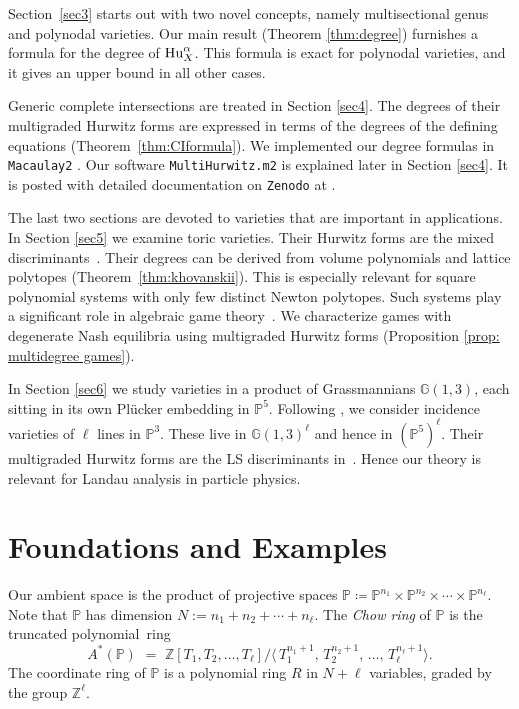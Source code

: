 \documentclass[12pt]{article}
\theoremstyle{definition}
\newcommand{\bZ}{\mathbb Z}
\newcommand{\bG}{\mathbb G}
\newcommand{\bP}{\mathbb P}
\begin{document}
Section~\ref{sec3} starts out with two novel concepts, namely
multisectional genus and polynodal varieties.
Our main result (Theorem \ref{thm:degree})
 furnishes a formula for the degree of ${\rm Hu}^\alpha_X$.
This formula is exact for polynodal varieties, and it 
gives an upper bound 
in all other cases.

Generic complete intersections are treated in Section \ref{sec4}.
The degrees of their multigraded Hurwitz forms are expressed
in terms of the degrees of the defining equations (Theorem~\ref{thm:CIformula}).
We implemented our degree formulas in {\tt Macaulay2} \cite{M2}.
Our software {\tt MultiHurwitz.m2} is explained later in Section \ref{sec4}.
It is posted with detailed documentation 
on {\tt Zenodo} at \cite{zenodo}.
 
 The last two sections are devoted to varieties that are important in applications. In Section \ref{sec5}
  we examine toric varieties. Their Hurwitz forms
  are the mixed discriminants~\cite{CCDDS}. 
  Their degrees can be derived from volume polynomials \cite{Huh}
  and lattice polytopes   (Theorem~\ref{thm:khovanskii}).
  This is especially relevant for square
polynomial  systems with  only few distinct Newton polytopes.
  Such systems play a significant role in algebraic game theory~\cite{vectorBundleNash}.
We characterize games with degenerate Nash equilibria using 
multigraded Hurwitz forms (Proposition \ref{prop: multidegree games}).

  In Section \ref{sec6} we study varieties in a product of Grassmannians
  $\bG(1,3)$,   each sitting in its own Pl\"ucker embedding in $\bP^5$.
   Following \cite{HMPS1}, we consider
  incidence varieties of $\ell$ lines in $\bP^3$. These live
 in $\bG(1,3)^\ell$ and hence in $(\bP^5)^\ell$.
 Their multigraded Hurwitz forms are  the
LS discriminants in~\cite{HMPS2}.
Hence our theory is relevant for
  Landau analysis in particle physics. 

\section{Foundations and Examples}
\label{sec2}

Our ambient space is the product of projective spaces $\bP \coloneqq \bP^{n_1} \times \bP^{n_2} \times \cdots \times \bP^{n_\ell}$.
Note that $\bP$ has dimension $N:= n_1+n_2+\cdots+n_\ell$. 
The {\em Chow ring} of $\bP$ is the truncated polynomial~ring
\begin{equation}
\label{eq:chowring}
 A^*(\bP) \,\,=\,\, \bZ[T_1,T_2,\ldots,T_\ell] / \bigl\langle \,
T_1^{n_1+1},  \,T_2^{n_2+1},\,\ldots, \,T_\ell^{n_\ell+1} \bigr\rangle. 
\end{equation}
The coordinate
ring of $\bP$ is a polynomial ring $R$ in $N+\ell$ variables,  graded by the group $\bZ^\ell$.
\end{document}
